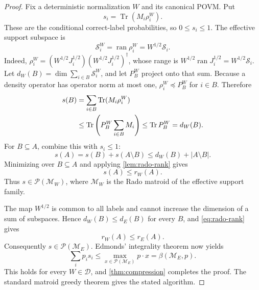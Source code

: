\documentclass[11pt]{article}
\theoremstyle{definition}
\theoremstyle{remark}
\newcommand{\ran}{\operatorname{ran}}
\newcommand{\Tr}{\operatorname{Tr}}
\newcommand{\cD}{\mathcal D}
\newcommand{\cM}{\mathcal M}
\newcommand{\cP}{\mathcal P}
\newcommand{\cS}{\mathcal S}
\begin{document}
\begin{proof}
Fix a deterministic normalization $W$ and its canonical POVM.  Put
\begin{equation}
             s_i=\Tr(M_i\rho_i^W).                       \label{eq:si}
\end{equation}
These are the conditional correct-label probabilities, so $0\leq s_i\leq1$.
The effective support subspace is
\begin{equation}
 \cS_i^W=\ran\rho_i^W=W^{1/2}\cS_i.                    \label{eq:effsupport}
\end{equation}
Indeed,
$\rho_i^W=(W^{1/2}J_i^{1/2})(W^{1/2}J_i^{1/2})^\dagger$,
whose range is $W^{1/2}\ran J_i^{1/2}=W^{1/2}\cS_i$.
Let
$d_W(B)=\dim\sum_{i\in B}\cS_i^W$, and let $P_B^W$ project onto that sum.
Because a density operator has operator norm at most one,
$\rho_i^W\preceq P_B^W$ for $i\in B$.  Therefore
\begin{align}
 s(B)
 &=\sum_{i\in B}\Tr(M_i\rho_i^W)\notag\\
 &\leq\Tr\left(P_B^W\sum_{i\in B}M_i\right)
 \leq\Tr P_B^W=d_W(B).                                  \label{eq:supportineq}
\end{align}
For $B\subseteq A$, combine this with $s_i\leq1$:
\begin{equation}
 s(A)=s(B)+s(A\setminus B)
 \leq d_W(B)+|A\setminus B|.                            \label{eq:radoineq1}
\end{equation}
Minimizing over $B\subseteq A$ and applying
\cref{lem:rado-rank} gives
\begin{equation}
                         s(A)\leq r_W(A).                \label{eq:radoineq2}
\end{equation}
Thus $s\in\cP(\cM_W)$, where $\cM_W$ is the Rado matroid of the effective
support family.

The map $W^{1/2}$ is common to all labels and cannot increase the dimension
of a sum of subspaces.  Hence $d_W(B)\leq d_E(B)$ for every $B$, and
\cref{eq:rado-rank} gives
\begin{equation}
                         r_W(A)\leq r_E(A).              \label{eq:rankmon}
\end{equation}
Consequently $s\in\cP(\cM_E)$.  Edmonds' integrality theorem now yields
\[
 \sum_i p_is_i\leq
 \max_{x\in\cP(\cM_E)}p\mathbin\cdot x
 =\beta(\cM_E,p).
\]
This holds for every $W\in\cD$, and \cref{thm:compression} completes the
proof.  The standard matroid greedy theorem gives the stated algorithm.
\end{proof}
\end{document}
